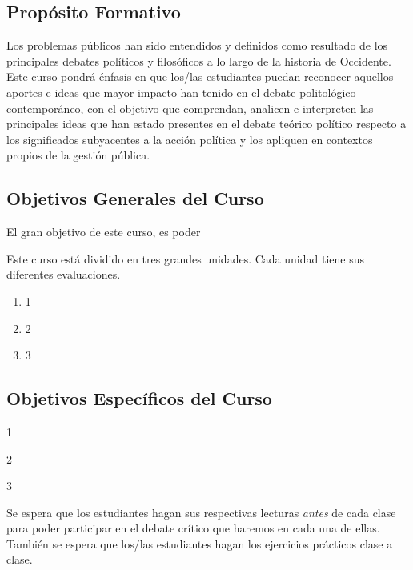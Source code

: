 \documentclass[letterpaper]{article}
\renewenvironment{itemize}{
  \begin{list}{}{
    \setlength{\leftmargin}{1.5em}
  }
}{
  \end{list}
}
\begin{document}
\subsection*{Prop\'osito Formativo}

Los problemas p\'ublicos han sido entendidos y definidos como resultado de los principales debates pol\'iticos y filos\'oficos a lo largo de la historia de Occidente. Este curso pondr\'a \'enfasis en que los/las estudiantes puedan reconocer aquellos aportes e ideas que mayor impacto han tenido en el debate politol\'ogico contempor\'aneo, con el objetivo que comprendan, analicen e interpreten las principales ideas que han estado presentes en el debate te\'orico pol\'itico respecto a los significados subyacentes a la acci\'on pol\'itica y los apliquen en contextos propios de la gesti\'on p\'ublica.

\subsection*{Objetivos Generales del Curso}

El gran objetivo de este curso, es poder 

Este curso est\'a dividido en tres grandes unidades. Cada unidad tiene sus diferentes evaluaciones.


\begin{enumerate}
	\item 1
	\item 2
	\item 3
\end{enumerate}
 

\subsection*{Objetivos Espec\'ificos del Curso}

\begin{itemize}
	\item[$\bullet$] 1
	\item[$\bullet$] 2
	\item[$\bullet$] 3
\end{itemize}


\begin{itemize}
		\item[{\color{red}\Pointinghand}] Se espera que los estudiantes hagan sus respectivas lecturas \emph{antes} de cada clase para poder participar en el debate cr\'itico que haremos en cada una de ellas. Tambi\'en se espera que los/las estudiantes hagan los ejercicios pr\'acticos clase a clase.
\end{itemize}
\end{document}
